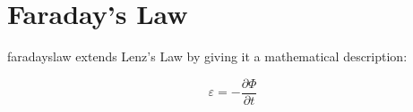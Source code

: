 	
	
	
	
	
	
	\section{Faraday's Law}
	\gls{faradayslaw} extends Lenz's Law by giving it a mathematical description:
	
			\begin{mdframed}[backgroundcolor=orange!20!white]
		
		\begin{equation}
		\varepsilon = - \frac{\partial \Phi}{\partial t}
		\label{equation:faradayslaw}
		\end{equation}
	\end{mdframed}	
	
	